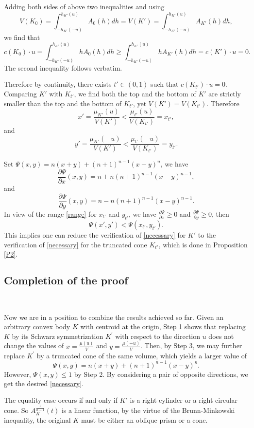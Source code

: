 \documentclass[12pt]{amsart}
\numberwithin{equation}{section}
\numberwithin{lemma}{section}
\numberwithin{proposition}{section}
\numberwithin{corollary}{section}
\numberwithin{remark}{section}
\begin{document}
Adding both sides of above two inequalities and using 
\[
V(K_0)=\int_{-h_{K'}(-u)}^{h_{K'}(u)} A_0(h) dh =V(K')=\int_{-h_{K'}(-u)}^{h_{K'}(u)} A_{K'}(h) dh,
\]
we find that 
\[
c(K_0)\cdot u=\int_{-h_{K'}(-u)}^{h_{K'}(u)} h A_0(h) dh \geq \int_{-h_{K'}(-u)}^{h_{K'}(u)} h A_{K'}(h) dh=c(K')\cdot u=0.
\]
The second inequality follows verbatim. 

Therefore by continuity, there exists $t'\in(0,1)$ such that $c(K_{t'})\cdot u=0$. 
Comparing $K'$ with $K_{t'}$, we find both the top and the bottom of $K'$ are strictly smaller than the top and the bottom of $K_{t'}$, yet $V(K')=V(K_{t'})$. 
Therefore 
\[
x'=\frac{\mu_{K'}(u)}{V(K')}< \frac{\mu_{t'}(u)}{V(K_{t'})}=x_{t'},
\]
and 
\[
y'=\frac{\mu_{K'}(-u)}{V(K')}<\frac{\mu_{t'}(-u)}{V(K_{t'})}=y_{t'}.
\]

Set $\Psi(x,y)= n(x+y)+(n+1)^{n-1}(x-y)^{n}$, we have
\[
\frac{\partial \Psi}{\partial x}(x,y)=n+n(n+1)^{n-1}(x-y)^{n-1},
\]
and 
\[
\frac{\partial \Psi}{\partial y}(x,y)=n-n(n+1) ^{n-1}(x-y)^{n-1}. 
\]
In view of the range \eqref{range} for $x_{t'}$ and $y_{t'}$, we have $\frac{\partial \Psi}{\partial x}\geq 0$ and $\frac{\partial \Psi}{\partial y}\geq 0$, then
\[
\Psi(x', y')< \Psi(x_{t'}, y_{t'}). 
\]
This implies one can reduce the verification of \eqref{necessary} for $K'$ to the verification of \eqref{necessary} for the truncated cone $K_{t'}$, which is done in Proposition \ref{P2}.

\subsection{Completion of the proof}
\ 

Now we are in a position to combine the results achieved so far. Given an arbitrary convex body $K$ with centroid at the origin, Step 1 shows that replacing $K$ by its Schwarz symmetrization $K^{\prime}$ with respect to the direction $u$ does not change the values of $x=\frac{\mu(u)}{V}$ and $y=\frac{\mu(-u)}{V}$. Then, by Step 3, we may further replace $K^{\prime}$ by a truncated cone of the same volume, which yields a larger value of
$$
\Psi(x, y)=n(x+y)+(n+1)^{n-1}(x-y)^n.
$$
However, $\Psi(x,y)\leq 1$ by Step 2. By considering a pair of opposite directions, we get the desired \eqref{necessary}.

The equality case occurs if and only if $K'$ is a right cylinder or a right circular cone. So $A_{K}^{\frac{1}{n-1}}(t)$ is a linear function, by the virtue of the Brunn-Minkowski inequality, the original $K$ must be either an oblique prism or a cone.
\end{document}
